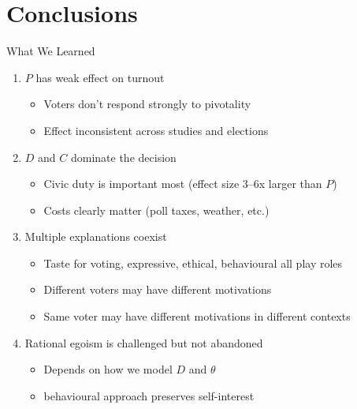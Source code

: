 \documentclass[10pt]{beamer}
\begin{document}
\section{Conclusions}

\begin{frame}{What We Learned}
\begin{enumerate}
\item \alert{$P$ has weak effect on turnout}
\begin{itemize}
\item Voters don't respond strongly to pivotality
\item Effect inconsistent across studies and elections
\end{itemize}

\item \alert{$D$ and $C$ dominate the decision}
\begin{itemize}
\item Civic duty is important most (effect size 3--6x larger than $P$)
\item Costs clearly matter (poll taxes, weather, etc.)
\end{itemize}

\item \alert{Multiple explanations coexist}
\begin{itemize}
\item Taste for voting, expressive, ethical, behavioural all play roles
\item Different voters may have different motivations
\item Same voter may have different motivations in different contexts
\end{itemize}

\item \alert{Rational egoism is challenged but not abandoned}
\begin{itemize}
\item Depends on how we model $D$ and $\theta$
\item behavioural approach preserves self-interest
\end{itemize}
\end{enumerate}
\end{frame}
\end{document}
